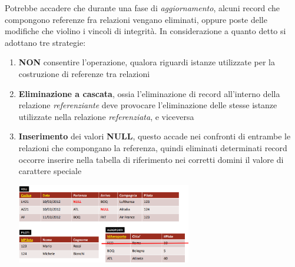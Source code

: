\documentclass{article}
\begin{document}
Potrebbe accadere che durante una fase di \textit{aggiornamento}, alcuni record che compongono referenze fra relazioni vengano eliminati, oppure poste delle modifiche che violino i vincoli di integrità. In considerazione a quanto detto si adottano tre strategie:
\begin{enumerate}
    \renewcommand{\labelenumi}{-}
    \item \textbf{NON} consentire l'operazione, qualora riguardi istanze utilizzate per la costruzione di referenze tra relazioni
    \item \textbf{Eliminazione a cascata}, ossia l'eliminazione di record all'interno della relazione \textit{referenziante} deve provocare l'eliminazione delle stesse istanze utilizzate nella relazione \textit{referenziata}, e viceversa
    \item \textbf{Inserimento} dei valori \textbf{NULL}, questo accade nei confronti di entrambe le relazioni che compongano la referenza, quindi eliminati determinati record occorre inserire nella tabella di riferimento nei corretti domini il valore di carattere speciale
    \begin{center}
        \includegraphics[width = 0.6\textwidth]{foto 6.png}
    \end{center}
\end{enumerate}
\end{document}
